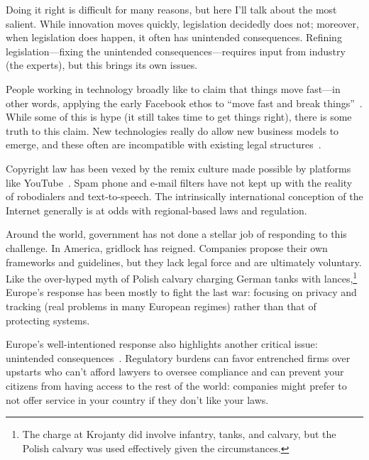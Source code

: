 Doing it right is difficult for many reasons, but here I'll talk about
the most salient.  While innovation moves quickly, legislation
decidedly does not; moreover, when legislation does happen, it often
has unintended consequences.  Refining legislation---fixing the
unintended consequences---requires input from industry (the experts),
but this brings its own issues.

People working in technology broadly like to claim that things move
fast---in other words, applying the early Facebook ethos to ``move fast and break
  things''~\citep{vardi-18}.  While some of this is hype (it still takes time to get
things right), there is some truth to this claim.  New technologies
really do allow new business models to emerge, and these often are
incompatible with existing legal structures~\citep{nieuwland-18}.

Copyright law has been vexed by the remix culture made possible by
platforms like YouTube~\citep{lessig-08}.  Spam phone and e-mail filters have not kept up with
the reality of robodialers and text-to-speech.  The intrinsically
international conception of the Internet generally is at odds with
regional-based laws and regulation.


Around the world, government has not done a stellar job of responding
to this challenge.  In America, gridlock has reigned.  Companies
propose their own frameworks and guidelines, but they lack legal force
and are ultimately voluntary.  Like the over-hyped myth of Polish
calvary charging German tanks with lances,\footnote{The charge at
  Krojanty did involve infantry, tanks, and calvary, but the Polish
  calvary was used effectively given the circumstances.  } Europe's response has been mostly to
fight the last war: focusing on privacy and tracking (real problems in
many European regimes) rather than that of protecting systems.

Europe's well-intentioned  response also highlights another
critical issue: unintended consequences~\citep{goodman-17}.  Regulatory burdens can favor
entrenched firms over upstarts who can't afford lawyers to oversee
compliance and can prevent your citizens from having access to the
rest of the world: companies might prefer to not offer service in
your country if they don't like your laws.

